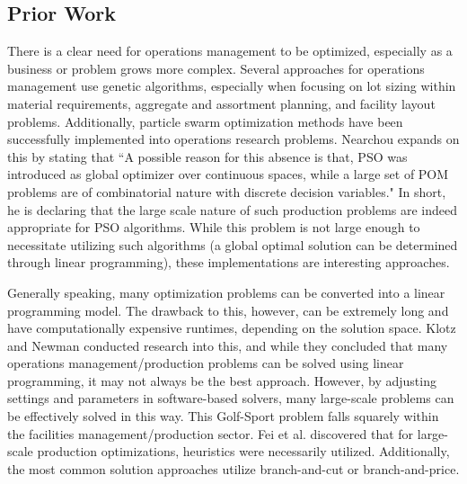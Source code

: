 \documentclass{article}
\begin{document}
\subsection{Prior Work}
There is a clear need for operations management to be optimized, especially as a business or problem grows more complex. Several approaches for operations management use genetic algorithms, especially when focusing on lot sizing within material requirements, aggregate and assortment planning, and facility layout problems.\cite{gen}  
Additionally, particle swarm optimization methods have been successfully implemented into operations research problems.  Nearchou expands on this by stating that ``A possible reason for this absence is that, PSO was introduced as global optimizer over continuous spaces, while a large set of POM problems are of combinatorial nature with discrete decision variables."\cite{and}  In short, he is declaring that the large scale nature of such production problems are indeed appropriate for PSO algorithms.  
While this problem is not large enough to necessitate utilizing such algorithms (a global optimal solution can be determined through linear programming), these implementations are interesting approaches.
\par
Generally speaking, many optimization problems can be converted into a linear programming model.  The drawback to this, however, can be extremely long and have computationally expensive runtimes, depending on the solution space.  Klotz and Newman conducted research into this, and 
while they concluded that many operations management/production problems can be solved using linear programming, it may not always be the best approach.  However, by adjusting settings and parameters in software-based solvers, many large-scale problems can be effectively solved in this way.\cite{klotz}  This Golf-Sport problem falls squarely within the facilities management/production sector.  Fei et al. discovered that for large-scale production optimizations, heuristics were necessarily utilized.  Additionally, the most common solution approaches utilize branch-and-cut or branch-and-price.\cite{survey}
\end{document}
